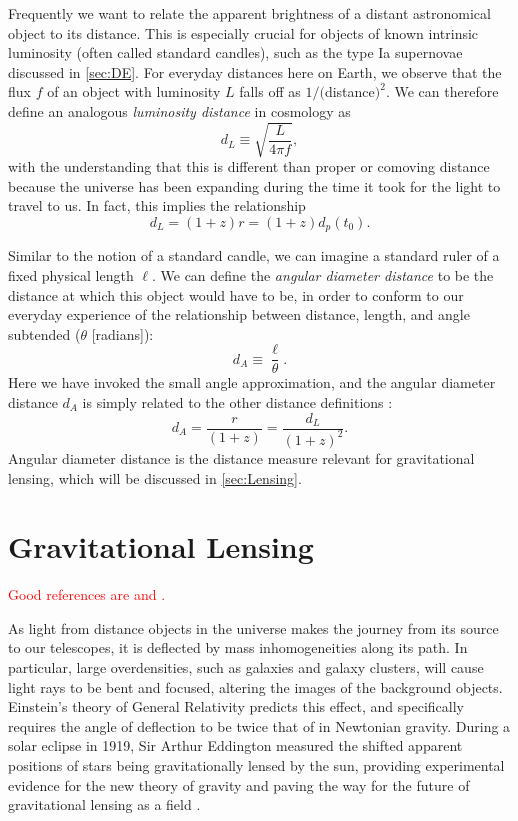 Frequently we want to relate the apparent brightness of a distant astronomical object to its distance. This is especially crucial for objects of known intrinsic luminosity (often called standard candles), such as the type Ia supernovae discussed in \autoref{sec:DE}. For everyday distances here on Earth, we observe that the flux $f$ of an object with luminosity $L$ falls off as $1/($distance$)^2$. We can therefore define an analogous {\it luminosity distance} in cosmology as
\begin{equation}
d_L \equiv \sqrt{\frac{L}{4\pi f}},
\end{equation}
with the understanding that this is different than proper or comoving distance because the universe has been expanding during the time it took for the light to travel to us. In fact, this implies the relationship
\begin{equation}
d_L = (1+z)r = (1+z)d_p(t_0).
\end{equation}

Similar to the notion of a standard candle, we can imagine a standard ruler of a fixed physical length $\ell$. We can define the {\it angular diameter distance} to be the distance at which this object would have to be, in order to conform to our everyday experience of the relationship between distance, length, and angle subtended ($\theta$ [radians]):
\begin{equation}
d_A \equiv \frac{\ell}{\theta}.
\end{equation}
Here we have invoked the small angle approximation, and the angular diameter distance $d_A$ is simply related to the other distance definitions \citep{RydenText}:
\begin{equation}
d_A = \frac{r}{(1+z)}= \frac{d_L}{(1+z)^2}.
\end{equation}
Angular diameter distance is the distance measure relevant for gravitational lensing, which will be discussed in \autoref{sec:Lensing}.

\section{Gravitational Lensing}
\label{sec:Lensing}

\textcolor{red}{Good references are \citet{Schneider06_WeakGravLens} and \citet{Schneider06_IntroGravLensCosmology}.} 

As light from distance objects in the universe makes the journey from its source to our telescopes, it is deflected by mass inhomogeneities along its path. In particular, large overdensities, such as galaxies and galaxy clusters, will cause light rays to be bent and focused, altering the images of the background objects. Einstein's theory of General Relativity predicts this effect, and specifically requires the angle of deflection to be twice that of in Newtonian gravity. During a solar eclipse in 1919, Sir Arthur Eddington measured the shifted apparent positions of stars being gravitationally lensed by the sun, providing experimental evidence for the new theory of gravity and paving the way for the future of gravitational lensing as a field \citep{BS01}.

